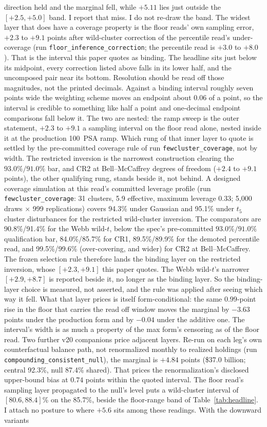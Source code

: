 \documentclass[12pt]{article}
\begin{document}
direction held and the marginal fell, while $+5.11$ lies just outside the $[+2.5, +5.0]$ band. I report that miss. I do not re-draw the band. The widest layer that does have a coverage property is the floor reads' own sampling error, $+2.3$ to $+9.1$ points after wild-cluster correction of the percentile read's under-coverage (run \texttt{floor\_inference\_correction}; the percentile read is $+3.0$ to $+8.0$). That is the interval this paper quotes as binding. The headline sits just below its midpoint, every correction listed above falls in its lower half, and the uncomposed pair near its bottom. Resolution should be read off those magnitudes, not the printed decimals. Against a binding interval roughly seven points wide the weighting scheme moves an endpoint about $0.06$ of a point, so the interval is credible to something like half a point and one-decimal endpoint comparisons fall below it. The two are nested: the ramp sweep is the outer statement, $+2.3$ to $+9.1$ a sampling interval on the floor read alone, nested inside it at the production 100~PSA ramp. Which rung of that inner layer to quote is settled by the pre-committed coverage rule of run \texttt{fewcluster\_coverage}, not by width. The restricted inversion is the narrowest construction clearing the $93.0\%/91.0\%$ bar, and CR2 at Bell--McCaffrey degrees of freedom ($+2.4$ to $+9.1$ points), the other qualifying rung, stands beside it, not behind. A designed coverage simulation at this read's committed leverage profile (run \texttt{fewcluster\_coverage}: 31 clusters, 5.9 effective, maximum leverage 0.33; 5{,}000 draws $\times$ 999 replications) covers 94.3\% under Gaussian and 95.1\% under $t_5$ cluster disturbances for the restricted wild-cluster inversion. The comparators are 90.8\%/91.4\% for the Webb wild-$t$, below the spec's pre-committed $93.0\%/91.0\%$ qualification bar, 84.0\%/85.7\% for CR1, 89.5\%/89.9\% for the demoted percentile read, and 99.5\%/99.6\% (over-covering, and wider) for CR2 at Bell--McCaffrey. The frozen selection rule therefore lands the binding layer on the restricted inversion, whose $[+2.3, +9.1]$ this paper quotes. The Webb wild-$t$'s narrower $[+2.9, +8.7]$ is reported beside it, no longer as the binding layer. So the binding-layer choice is measured, not asserted, and the rule was applied after seeing which way it fell. What that layer prices is itself form-conditional: the same $0.99$-point rise in the floor that carries the read off window moves the marginal by $-3.63$ points under the production form and by $-0.04$ under the additive one. The interval's width is as much a property of the max form's censoring as of the floor read. Two further v20 companions price adjacent layers. Re-run on each leg's own counterfactual balance path, not renormalized monthly to realized holdings (run \texttt{compounding\_consistent\_null}), the marginal is $+4.84$ points (\$37.0 billion; central 92.3\%, null 87.4\% shared). That prices the renormalization's disclosed upper-bound bias at $0.74$ points within the quoted interval. The floor read's sampling layer propagated to the null's level puts a wild-cluster interval of $[80.6, 88.4]$\% on the 85.7\%, beside the floor-range band of Table~\ref{tab:headline}. I attach no posture to where $+5.6$ sits among these readings. With the downward variants 
\end{document}
